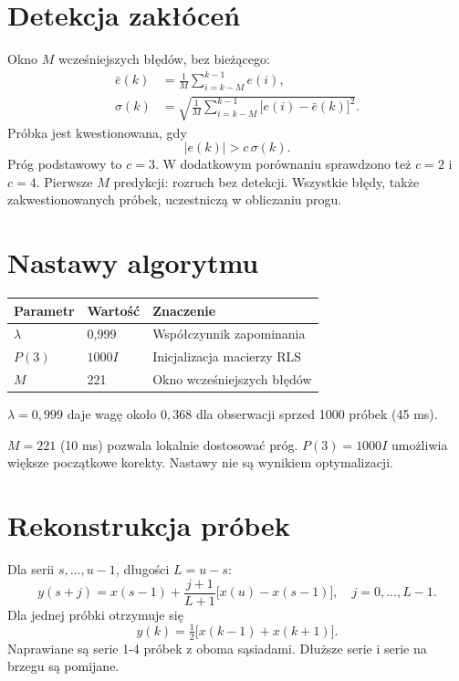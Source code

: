 \documentclass[11pt,a4paper]{article}
\begin{document}
\section{Detekcja zakłóceń}
Okno $M$ wcześniejszych błędów, bez bieżącego:
\begin{align}
\bar e(k)&=\frac{1}{M}\sum_{i=k-M}^{k-1}e(i),\\
\sigma(k)&=\sqrt{\frac{1}{M}\sum_{i=k-M}^{k-1}\bigl[e(i)-\bar e(k)\bigr]^2}.
\end{align}
Próbka jest kwestionowana, gdy
\begin{equation}
|e(k)|>c\,\sigma(k).
\end{equation}
Próg podstawowy to $c=3$. W dodatkowym porównaniu sprawdzono też $c=2$ i $c=4$.
Pierwsze $M$ predykcji: rozruch bez detekcji. Wszystkie błędy, także zakwestionowanych próbek, uczestniczą w obliczaniu progu.

\section{Nastawy algorytmu}
\begin{center}
\begin{tabular}{lll}
\toprule
Parametr & Wartość & Znaczenie\\
\midrule
$\lambda$ & 0,999 & Współczynnik zapominania\\
$P(3)$ & $1000I$ & Inicjalizacja macierzy RLS\\
$M$ & 221 & Okno wcześniejszych błędów\\
\bottomrule
\end{tabular}
\end{center}
$\lambda=0{,}999$ daje wagę około $0{,}368$ dla obserwacji sprzed 1000 próbek (45 ms).

$M=221$ (10 ms) pozwala lokalnie dostosować próg. $P(3)=1000I$ umożliwia większe początkowe korekty. Nastawy nie są wynikiem optymalizacji.

\section{Rekonstrukcja próbek}
Dla serii $s,\ldots,u-1$, długości $L=u-s$:
\begin{equation}
y(s+j)=x(s-1)+\frac{j+1}{L+1}\bigl[x(u)-x(s-1)\bigr],\quad j=0,\ldots,L-1.
\end{equation}
Dla jednej próbki otrzymuje się
\begin{equation}
y(k)=\tfrac12\bigl[x(k-1)+x(k+1)\bigr].
\end{equation}
Naprawiane są serie 1-4 próbek z oboma sąsiadami. Dłuższe serie i serie na brzegu są pomijane.
\end{document}
